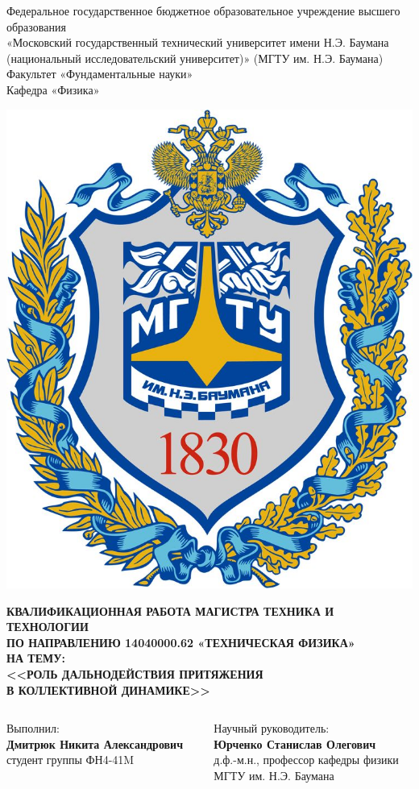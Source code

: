 \documentclass{beamer}
\begin{document}
\begin{frame}
	\begin{center}\tiny
		Федеральное государственное бюджетное образовательное учреждение высшего образования \\ «Московский государственный технический университет имени Н.Э. Баумана (национальный исследовательский университет)» (МГТУ им. Н.Э. Баумана)\\
		Факультет «Фундаментальные науки»\\
		Кафедра «Физика»\\
    \end{center}

	\begin{center}
		\includegraphics[width=0.15\linewidth]{emb}
	\end{center}

	\begin{center}
\tiny \textbf{КВАЛИФИКАЦИОННАЯ РАБОТА МАГИСТРА ТЕХНИКА И ТЕХНОЛОГИИ \\ ПО НАПРАВЛЕНИЮ 14040000.62 «ТЕХНИЧЕСКАЯ ФИЗИКА»}\\
\vspace{0.2cm}
\tiny \textbf{НА ТЕМУ:}\\
\vspace{0.1cm}
\tiny \textbf{<<РОЛЬ ДАЛЬНОДЕЙСТВИЯ ПРИТЯЖЕНИЯ \\ В КОЛЛЕКТИВНОЙ ДИНАМИКЕ>>}\\
\end{center}

\vspace{0.3cm}

\begin{columns}
\begin{column}{0.50\textwidth}
\begin{center}
\tiny Выполнил: \\
\vspace{0.1cm}
\tiny \textbf{Дмитрюк Никита Александрович}\\
\tiny студент группы ФН4-41M \\
\vspace{0.2cm}
\end{center}
\end{column}


\begin{column}{0.50\textwidth}
\begin{center}
\tiny Научный руководитель:\\
\vspace{0.1cm}
\tiny \textbf{Юрченко Станислав Олегович} \\
\tiny д.ф.-м.н., профессор кафедры физики\\
\tiny МГТУ им. Н.Э. Баумана \\
\end{center}



\end{column}
\end{columns}
\end{frame}
\end{document}
